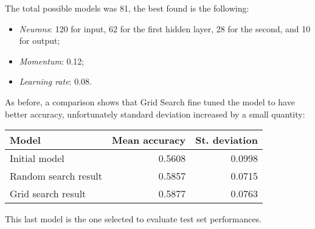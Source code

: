 The total possible models was 81, the best found is the following:
\begin{itemize}
    \item \emph{Neurons}: 120 for input, 62 for the first hidden layer, 28 for the second, and 10 for output; 
    \item \emph{Momentum}: 0.12;
    \item \emph{Learning rate}: 0.08.
\end{itemize}
As before, a comparison shows that Grid Search fine tuned the model 
to have better accuracy, unfortunately standard deviation increased by a small 
quantity:
\begin{center}
    \begin{tabular}{ |l|r|r| } 
        \hline
        Model & Mean accuracy & St. deviation \\
        \hline
        Initial model & 0.5608& 0.0998\\
        Random search result & 0.5857 & 0.0715 \\
        Grid search result & 0.5877 & 0.0763 \\
        \hline
    \end{tabular}
\end{center}
This last model is the one selected to evaluate test set performances.
\newpage